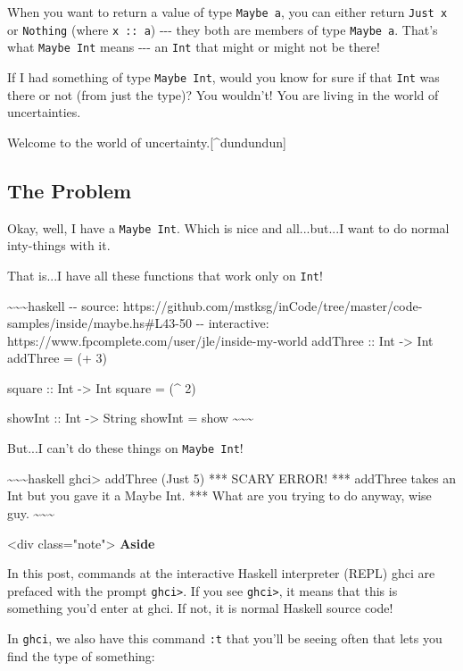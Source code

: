 \documentclass[]{article}
\begin{document}
When you want to return a value of type \texttt{Maybe\ a}, you can either return
\texttt{Just\ x} or \texttt{Nothing} (where \texttt{x\ ::\ a}) -\/-\/- they both
are members of type \texttt{Maybe\ a}. That's what \texttt{Maybe\ Int} means
-\/-\/- an \texttt{Int} that might or might not be there!

If I had something of type \texttt{Maybe\ Int}, would you know for sure if that
\texttt{Int} was there or not (from just the type)? You wouldn't! You are living
in the world of uncertainties.

Welcome to the world of uncertainty.{[}\^{}dundundun{]}

\subsection{The Problem}

Okay, well, I have a \texttt{Maybe\ Int}. Which is nice and all...but...I want
to do normal inty-things with it.

That is...I have all these functions that work only on \texttt{Int}!

\textasciitilde{}\textasciitilde{}\textasciitilde{}haskell -\/- source:
https://github.com/mstksg/inCode/tree/master/code-samples/inside/maybe.hs\#L43-50
-\/- interactive: https://www.fpcomplete.com/user/jle/inside-my-world addThree
:: Int -\textgreater{} Int addThree = (+ 3)

square :: Int -\textgreater{} Int square = (\^{} 2)

showInt :: Int -\textgreater{} String showInt = show
\textasciitilde{}\textasciitilde{}\textasciitilde{}

But...I can't do these things on \texttt{Maybe\ Int}!

\textasciitilde{}\textasciitilde{}\textasciitilde{}haskell ghci\textgreater{}
addThree (Just 5) *** SCARY ERROR! *** addThree takes an Int but you gave it a
Maybe Int. *** What are you trying to do anyway, wise guy.
\textasciitilde{}\textasciitilde{}\textasciitilde{}

\textless{}div class="note"\textgreater{} \textbf{Aside}

In this post, commands at the interactive Haskell interpreter (REPL) ghci are
prefaced with the prompt \texttt{ghci\textgreater{}}. If you see
\texttt{ghci\textgreater{}}, it means that this is something you'd enter at
ghci. If not, it is normal Haskell source code!

In \texttt{ghci}, we also have this command \texttt{:t} that you'll be seeing
often that lets you find the type of something:
\end{document}
